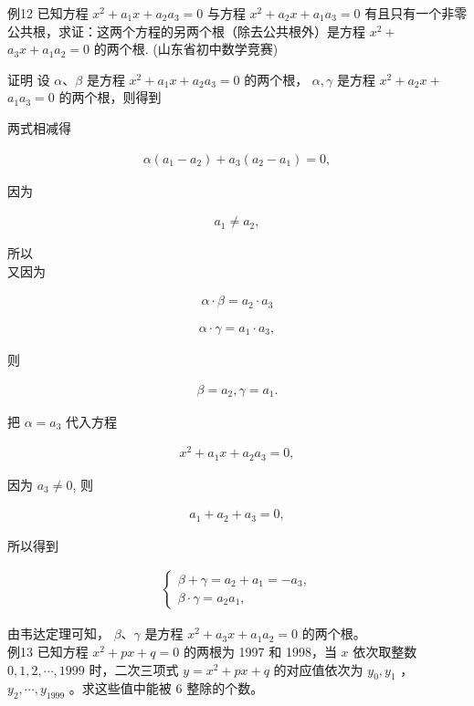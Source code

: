\documentclass[10pt]{article}
\begin{document}
例12 已知方程 $x^{2}+a_{1} x+a_{2} a_{3}=0$ 与方程 $x^{2}+a_{2} x+a_{1} a_{3}=0$ 有且只有一个非零公共根，求证：这两个方程的另两个根（除去公共根外）是方程 $x^{2}+$ $a_{3} x+a_{1} a_{2}=0$ 的两个根. (山东省初中数学竞赛)

证明 设 $\alpha 、 \beta$ 是方程 $x^{2}+a_{1} x+a_{2} a_{3}=0$ 的两个根， $\alpha, \gamma$ 是方程 $x^{2}+a_{2} x+$ $a_{1} a_{3}=0$ 的两个根，则得到

两式相减得

\begin{align*}
\alpha\left(a_{1}-a_{2}\right)+a_{3}\left(a_{2}-a_{1}\right)=0,
\end{align*}

因为

\begin{align*}
a_{1} \neq a_{2},
\end{align*}

所以\\
又因为

\begin{align*}
\alpha \cdot \beta=a_{2} \cdot a_{3}
\end{align*}

\begin{align*}
\alpha \cdot \gamma=a_{1} \cdot a_{3},
\end{align*}

则

\begin{align*}
\beta=a_{2}, \gamma=a_{1} .
\end{align*}

把 $\alpha=a_{3}$ 代入方程

\begin{align*}
x^{2}+a_{1} x+a_{2} a_{3}=0,
\end{align*}

因为 $a_{3} \neq 0$, 则

\begin{align*}
a_{1}+a_{2}+a_{3}=0,
\end{align*}

所以得到

\begin{align*}
\left\{\begin{array}{l}
\beta+\gamma=a_{2}+a_{1}=-a_{3}, \\
\beta \cdot \gamma=a_{2} a_{1},
\end{array}\right.
\end{align*}

由韦达定理可知， $\beta 、 \gamma$ 是方程 $x^{2}+a_{3} x+a_{1} a_{2}=0$ 的两个根。\\
例13 已知方程 $x^{2}+p x+q=0$ 的两根为 1997 和 1998，当 $x$ 依次取整数 $0,1,2, \cdots, 1999$ 时，二次三项式 $y=x^{2}+p x+q$ 的对应值依次为 $y_{0}, y_{1}$ ， $y_{2}, \cdots, y_{1999}$ 。求这些值中能被 6 整除的个数。
\end{document}
